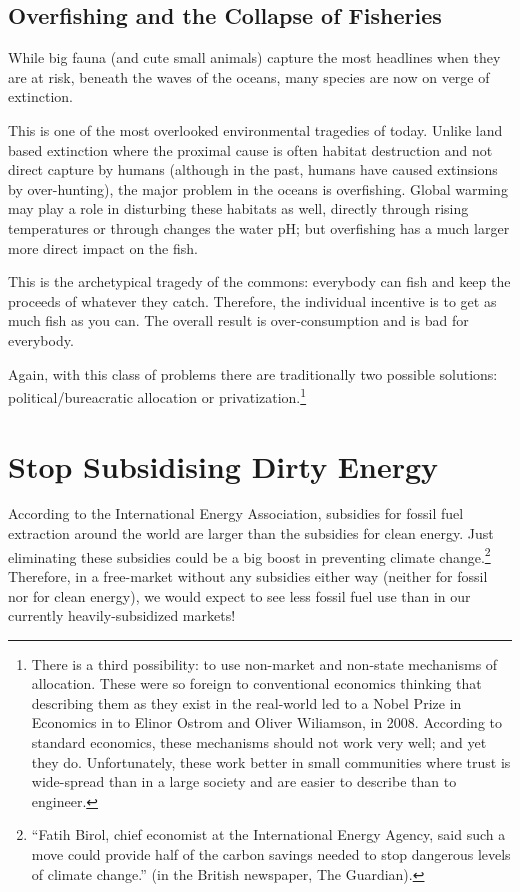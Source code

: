 \subsection{Overfishing and the Collapse of Fisheries}

While big fauna (and cute small animals) capture the most headlines when they
are at risk, beneath the waves of the oceans, many species are now on verge of
extinction.

This is one of the most overlooked environmental tragedies of today. Unlike
land based extinction where the proximal cause is often habitat destruction and
not direct capture by humans (although in the past, humans have caused
extinsions by over-hunting), the major problem in the oceans is overfishing.
Global warming may play a role in disturbing these habitats as well, directly
through rising temperatures or through changes the water pH; but overfishing
has a much larger more direct impact on the fish.

This is the archetypical tragedy of the commons: everybody can fish and keep
the proceeds of whatever they catch. Therefore, the individual incentive is to
get as much fish as you can. The overall result is over-consumption and is bad
for everybody.

Again, with this class of problems there are traditionally two possible
solutions: political/bureacratic allocation or privatization.\footnote{There
is a third possibility: to use non-market and non-state mechanisms of
allocation. These were so foreign to conventional economics thinking that
describing them as they exist in the real-world led to a Nobel Prize in
Economics in to Elinor Ostrom and Oliver Wiliamson, in 2008. According to
standard economics, these mechanisms should not work very well; and yet they
do. Unfortunately, these work better in small communities where trust is
wide-spread than in a large society and are easier to describe than to
engineer.}

\section{Stop Subsidising Dirty Energy}

According to the International Energy Association, subsidies for fossil fuel
extraction around the world are larger than the subsidies for clean energy.
Just eliminating these subsidies could be a big boost in preventing climate
change.\footnote{``Fatih Birol, chief
economist at the International Energy Agency, said such a move could
provide half of the carbon savings needed to stop dangerous levels of climate
change.'' (in the British newspaper, The Guardian).%
} Therefore, in a free-market without any subsidies either way (neither for
fossil nor for clean energy), we would expect to see less fossil fuel use than
in our currently heavily-subsidized markets!


